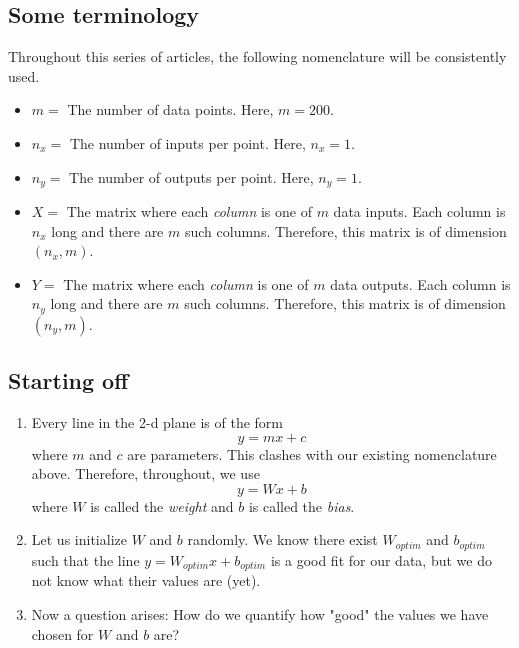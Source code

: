 \documentclass{article}
\begin{document}
        \subsection{Some terminology}
            Throughout this series of articles, the following nomenclature will be consistently used.
            \begin{itemize}
                \item $m = $ The number of data points. Here, $m = 200$.
                \item $n_x = $ The number of inputs per point. Here, $n_x = 1$.
                \item $n_y = $ The number of outputs per point. Here, $n_y = 1$.
                \item $X = $ The matrix where each \emph{column} is one of $m$ data inputs.
                            Each column is $n_x$ long and there are $m$ such columns. Therefore,
                            this matrix is of dimension $(n_x, m)$.
                \item $Y = $ The matrix where each \emph{column} is one of $m$ data outputs.
                            Each column is $n_y$ long and there are $m$ such columns. Therefore,
                            this matrix is of dimension $(n_y, m)$.
            \end{itemize}
        \subsection{Starting off}
            \begin{enumerate}
                \item Every line in the 2-d plane is of the form
                \[
                    y = mx + c
                \]
                where $m$ and $c$ are parameters. This clashes with our existing nomenclature above.
                Therefore, throughout, we use
                \[
                    y = Wx + b  
                \]
                where $W$ is called the \emph{weight} and $b$ is called the \emph{bias}.

                \item Let us initialize $W$ and $b$ randomly. We know there exist $W_{optim}$ and $b_{optim}$
                such that the line $y = W_{optim}x + b_{optim}$ is a good fit for our data, but we do not know
                what their values are (yet).

                \item Now a question arises: How do we quantify how "good" the values we have chosen for $W$
                and $b$ are?
            \end{enumerate}
        \newpage
\end{document}
